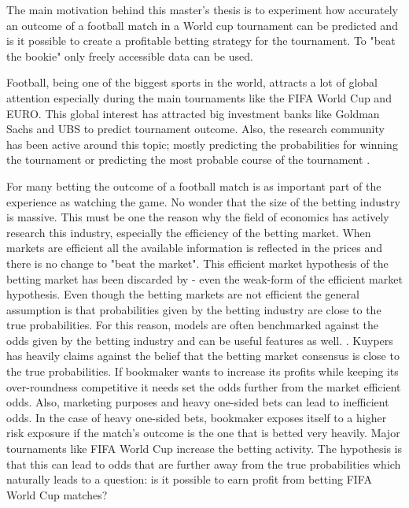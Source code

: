 The main motivation behind this master's thesis is to experiment how accurately an outcome of a football match in a World cup tournament can be predicted and is it possible to create a profitable betting strategy for the tournament. To "beat the bookie" only freely accessible data can be used.

Football, being one of the biggest sports in the world, attracts a lot of global attention especially during the main tournaments like the FIFA World Cup and EURO. This global interest has attracted big investment banks like Goldman Sachs and UBS to predict tournament outcome. Also, the research community has been active around this topic; mostly predicting the probabilities for winning the tournament or predicting the most probable course of the tournament \cite{groll2018prediction, groll2015prediction, leitner2010forecasting}.

For many betting the outcome of a football match is as important part of the experience as watching the game. No wonder that the size of the betting industry is massive. This must be one the reason why the field of economics has actively research this industry, especially the efficiency of the betting market. When markets are efficient all the available information is reflected in the prices and there is no change to "beat the market". This efficient market hypothesis of the betting market has been discarded by \cite{vlastakis2009efficient} - even the weak-form of the efficient market hypothesis. Even though the betting markets are not efficient the general assumption is that probabilities given by the betting industry are close to the true probabilities. For this reason, models are often benchmarked against the odds given by the betting industry and can be useful features as well. \cite{leitner2010forecasting}. Kuypers \cite{kuypers2008} has heavily claims against the belief that the betting market consensus is close to the true probabilities. If bookmaker wants to increase its profits while keeping its over-roundness competitive it needs set the odds further from the market efficient odds. Also, marketing purposes and heavy one-sided bets can lead to inefficient odds. In the case of heavy one-sided bets, bookmaker exposes itself to a higher risk exposure if the match's outcome is the one that is betted very heavily. Major tournaments like FIFA World Cup increase the betting activity. The hypothesis is that this can lead to odds that are further away from the true probabilities which naturally leads to a question: is it possible to earn profit from betting FIFA World Cup matches?

